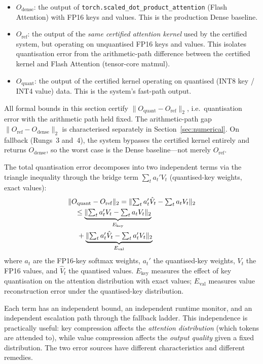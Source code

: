 \documentclass[10pt,twocolumn,a4paper]{article}
\theoremstyle{definition}
\theoremstyle{remark}
\newcommand{\norm}[1]{\lVert #1 \rVert}
\newcommand{\torchsdpa}{\texttt{torch.scaled\_\hspace{0pt}dot\_\hspace{0pt}product\_\hspace{0pt}attention}}
\begin{document}
\begin{itemize}[leftmargin=2em,itemsep=2pt]
\item $O_{\mathrm{dense}}$: the output of \torchsdpa{} (Flash Attention) with FP16 keys and values.  This is the production Dense baseline.
\item $O_{\mathrm{ref}}$: the output of the \emph{same certified attention kernel} used by the certified system, but operating on unquantised FP16 keys and values.  This isolates quantisation error from the arithmetic-path difference between the certified kernel and Flash Attention (tensor-core matmul).
\item $O_{\mathrm{quant}}$: the output of the certified kernel operating on quantised (INT8 key / INT4 value) data.  This is the system's fast-path output.
\end{itemize}

All formal bounds in this section certify $\norm{O_{\mathrm{quant}} - O_{\mathrm{ref}}}_2$, i.e.\ quantisation error with the arithmetic path held fixed.  The arithmetic-path gap $\norm{O_{\mathrm{ref}} - O_{\mathrm{dense}}}_2$ is characterised separately in Section~\ref{sec:numerical}.  On fallback (Rungs~3 and~4), the system bypasses the certified kernel entirely and returns $O_{\mathrm{dense}}$, so the worst case is the Dense baseline---not merely $O_{\mathrm{ref}}$.

The total quantisation error decomposes into two independent terms via the triangle inequality through the bridge term $\sum_t a_t' V_t$ (quantised-key weights, exact values):
\begin{align}
\label{eq:decomp}
  &\norm{O_{\mathrm{quant}} - O_{\mathrm{ref}}}_2
  = \norm{\textstyle\sum_t a_t' \hat{V}_t - \sum_t a_t V_t}_2 \notag \\
  &\quad\leq \underbrace{\norm{\textstyle\sum_t a_t' V_t - \sum_t a_t V_t}_2}_{E_{\mathrm{key}}} \notag \\
  &\quad\;+ \underbrace{\norm{\textstyle\sum_t a_t' \hat{V}_t - \sum_t a_t' V_t}_2}_{E_{\mathrm{val}}}
\end{align}
where $a_t$ are the FP16-key softmax weights, $a_t'$ the quantised-key weights, $V_t$ the FP16 values, and $\hat{V}_t$ the quantised values.  $E_{\mathrm{key}}$ measures the effect of key quantisation on the attention distribution with exact values; $E_{\mathrm{val}}$ measures value reconstruction error under the quantised-key distribution.

Each term has an independent bound, an independent runtime monitor, and an independent escalation path through the fallback ladder.  This independence is practically useful: key compression affects the \emph{attention distribution} (which tokens are attended to), while value compression affects the \emph{output quality} given a fixed distribution.  The two error sources have different characteristics and different remedies.
\end{document}
